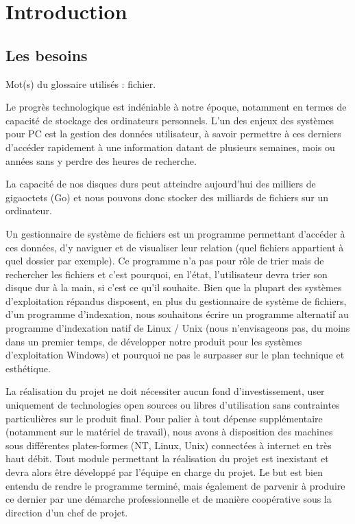 \documentclass[a4paper,12pt]{report}
\begin{document}
\glsaddall
\printglossaries

\tableofcontents

\chapter{Introduction}

\section{Les besoins}
Mot(s) du glossaire utilisés : \gls{fichier}.

Le progrès technologique est indéniable à notre époque, notamment en termes de  capacité de stockage des ordinateurs personnels. L'un des enjeux des systèmes pour PC est la gestion des données utilisateur, à savoir permettre à ces derniers d'accéder rapidement à une information datant de plusieurs semaines, mois ou années sans y perdre des heures de recherche.

La capacité de nos disques durs peut atteindre aujourd'hui des milliers de gigaoctets (Go) et nous pouvons donc stocker des milliards de fichiers sur un ordinateur.

Un gestionnaire de système de fichiers est un programme permettant d'accéder à ces données, d'y naviguer et de visualiser leur relation (quel fichiers appartient à quel dossier par exemple). Ce programme n'a pas pour rôle de trier mais de rechercher les fichiers et c'est pourquoi, en l'état, l'utilisateur devra trier son disque dur à la main, si c'est ce qu'il souhaite. Bien que la plupart des systèmes d'exploitation répandus disposent, en plus du gestionnaire de système de fichiers, d'un programme d'indexation, nous souhaitons écrire un programme alternatif au programme d'indexation natif de Linux / Unix (nous n'envisageons pas, du moins dans un premier temps, de développer notre produit pour les systèmes d'exploitation Windows) et pourquoi ne pas le surpasser sur le plan technique et esthétique.

La réalisation du projet ne doit nécessiter aucun fond d'investissement, user uniquement de technologies open sources ou libres d'utilisation sans contraintes particulières sur le produit final. Pour palier à tout dépense supplémentaire (notamment sur le matériel de travail), nous avons à disposition des machines sous différentes plates-formes (NT, Linux, Unix) connectées à internet en très haut débit. Tout module permettant la réalisation du projet est inexistant et devra alors être développé par l'équipe en charge du projet.
Le but est bien entendu de rendre le programme terminé, mais également de parvenir à produire ce dernier par une démarche professionnelle et de manière coopérative sous la direction d'un chef de projet.
\end{document}
